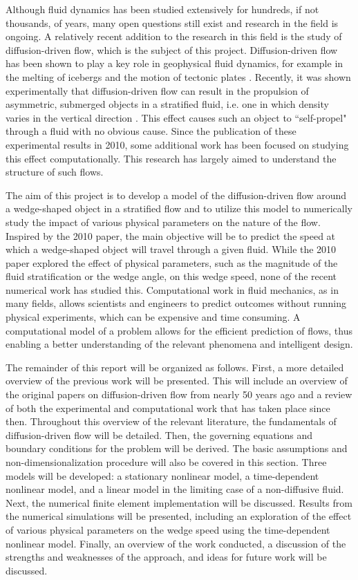 \documentclass[12pt]{article}
\begin{document}
Although fluid dynamics has been studied extensively for hundreds, if not thousands, of years, many open questions still exist and research in the field is ongoing. A relatively recent addition to the research in this field is the study of diffusion-driven flow, which is the subject of this project. Diffusion-driven flow has been shown to play a key role in geophysical fluid dynamics, for example in the melting of icebergs \cite{huppert_icebergs} and the motion of tectonic plates \cite{gurnis_mantle}. Recently, it was shown experimentally that diffusion-driven flow can result in the propulsion of asymmetric, submerged objects in a stratified fluid, i.e. one in which density varies in the vertical direction \cite{allshouse2010propulsion}. This effect causes such an object to ``self-propel" through a fluid with no obvious cause. Since the publication of these experimental results in 2010, some additional work has been focused on studying this effect computationally. This research has largely aimed to understand the structure of such flows.

The aim of this project is to develop a model of the diffusion-driven flow around a wedge-shaped object in a stratified flow and to utilize this model to numerically study the impact of various physical parameters on the nature of the flow. Inspired by the 2010 paper, the main objective will be to predict the speed at which a wedge-shaped object will travel through a given fluid. While the 2010 paper explored the effect of physical parameters, such as the magnitude of the fluid stratification or the wedge angle, on this wedge speed, none of the recent numerical work has studied this. Computational work in fluid mechanics, as in many fields, allows scientists and engineers to predict outcomes without running physical experiments, which can be expensive and time consuming. A computational model of a problem allows for the efficient prediction of flows, thus enabling a better understanding of the relevant phenomena and intelligent design.

The remainder of this report will be organized as follows. First, a more detailed overview of the previous work will be presented. This will include an overview of the original papers on diffusion-driven flow from nearly 50 years ago and a review of both the experimental and computational work that has taken place since then. Throughout this overview of the relevant literature, the fundamentals of diffusion-driven flow will be detailed. Then, the governing equations and boundary conditions for the problem will be derived. The basic assumptions and non-dimensionalization procedure will also be covered in this section. Three models will be developed: a stationary nonlinear model, a time-dependent nonlinear model, and a linear model in the limiting case of a non-diffusive fluid. Next, the numerical finite element implementation will be discussed. Results from the numerical simulations will be presented, including an exploration of the effect of various physical parameters on the wedge speed using the time-dependent nonlinear model. Finally, an overview of the work conducted, a discussion of the strengths and weaknesses of the approach, and ideas for future work will be discussed.
\end{document}
